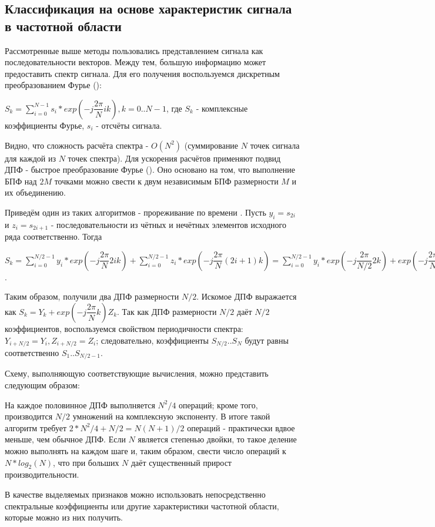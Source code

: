\subsection{Классификация на основе характеристик сигнала в частотной области}

Рассмотренные выше методы пользовались представлением сигнала как последовательности векторов. Между тем, большую информацию может предоставить спектр сигнала. Для его получения воспользуемся дискретным преобразованием Фурье ():

$S_k=\sum_{i=0}^{N-1}s_i*exp(-j\dfrac{2\pi}{N}ik), k=0..N-1$, где $S_k$ - комплексные коэффициенты Фурье, $s_i$ - отсчёты сигнала.

Видно, что сложность расчёта спектра - $O(N^2)$ (суммирование $N$ точек сигнала для каждой из $N$ точек спектра). Для ускорения расчётов применяют подвид ДПФ - быстрое преобразование Фурье (). Оно основано на том, что выполнение БПФ над $2M$ точками можно свести к двум независимым БПФ размерности $M$ и их объединению. 

Приведём один из таких алгоритмов - прореживание по времени \cite{fft_alg}. Пусть $y_i=s_{2i}$ и $z_i=s_{2i+1}$ - последовательности из чётных и нечётных элементов исходного ряда соответственно. Тогда

$S_k=\sum_{i=0}^{N/2-1}y_i*exp(-j\dfrac{2\pi}{N}2ik)+\sum_{i=0}^{N/2-1}z_i*exp(-j\dfrac{2\pi}{N}(2i+1)k)=\sum_{i=0}^{N/2-1}y_i*exp(-j\dfrac{2\pi}{N/2}2k)+exp(-j\dfrac{2\pi}{N}k)\sum_{i=0}^{N/2-1}z_i*exp(-j\dfrac{2\pi}{N/2}ik)$.

Таким образом, получили два ДПФ размерности $N/2$. Искомое ДПФ выражается как 
$S_k=Y_k+exp(-j\dfrac{2\pi}{N}k)Z_k$. Так как ДПФ размерности $N/2$ даёт $N/2$ коэффициентов, воспользуемся свойством периодичности спектра: $Y_{i+N/2}=Y_i, Z_{i+N/2}=Z_i$; следовательно, коэффициенты $S_{N/2}..S_{N}$ будут равны соответственно $S_{1}..S_{N/2-1}$. 

Схему, выполняющую соответствующие вычисления, можно представить следующим образом:


На каждое половинное ДПФ выполняется $N^2/4$ операций; кроме того, производится $N/2$ умножений на комплексную экспоненту. В итоге такой алгоритм требует $2*N^2/4+N/2=N(N+1)/2$ операций - практически вдвое меньше, чем обычное ДПФ. Если $N$ является степенью двойки, то такое деление можно выполнять на каждом шаге и, таким образом, свести число операций к $N*log_2(N)$, что при больших $N$ даёт существенный прирост производительности.

В качестве выделяемых признаков можно использовать непосредственно спектральные коэффициенты или другие характеристики частотной области, которые можно из них получить.

